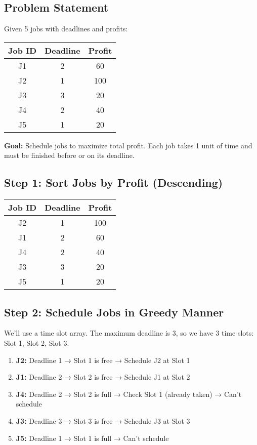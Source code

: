 \documentclass[14pt]{extarticle}
\begin{document}
\subsection{Problem Statement}
Given 5 jobs with deadlines and profits:

\begin{center}
\begin{tabular}{|c|c|c|}
\hline
\textbf{Job ID} & \textbf{Deadline} & \textbf{Profit} \\
\hline
J1 & 2 & 60 \\
J2 & 1 & 100 \\
J3 & 3 & 20 \\
J4 & 2 & 40 \\
J5 & 1 & 20 \\
\hline
\end{tabular}
\end{center}

\textbf{Goal:} Schedule jobs to maximize total profit. Each job takes 1 unit of time and must be finished before or on its deadline.

\subsection{Step 1: Sort Jobs by Profit (Descending)}

\begin{center}
\begin{tabular}{|c|c|c|}
\hline
\textbf{Job ID} & \textbf{Deadline} & \textbf{Profit} \\
\hline
J2 & 1 & 100 \\
J1 & 2 & 60 \\
J4 & 2 & 40 \\
J3 & 3 & 20 \\
J5 & 1 & 20 \\
\hline
\end{tabular}
\end{center}

\subsection{Step 2: Schedule Jobs in Greedy Manner}

We’ll use a time slot array. The maximum deadline is 3, so we have 3 time slots: Slot 1, Slot 2, Slot 3.

\begin{enumerate}[label=\textbf{Job \arabic*:}]
    \item \textbf{J2:} Deadline 1 → Slot 1 is free → Schedule J2 at Slot 1
    \item \textbf{J1:} Deadline 2 → Slot 2 is free → Schedule J1 at Slot 2
    \item \textbf{J4:} Deadline 2 → Slot 2 is full → Check Slot 1 (already taken) → Can't schedule
    \item \textbf{J3:} Deadline 3 → Slot 3 is free → Schedule J3 at Slot 3
    \item \textbf{J5:} Deadline 1 → Slot 1 is full → Can't schedule
\end{enumerate}
\end{document}
